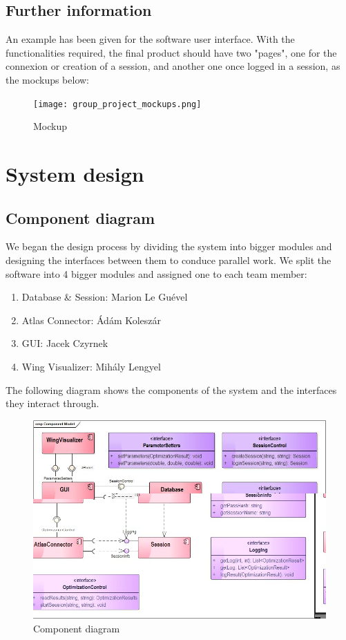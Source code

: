 \documentclass[10pt,a4paper]{report}
\begin{document}
	\section{Further information}
An example has been given for the software user interface. With the functionalities required, the final product should have two "pages", one for the connexion or creation of a session, and another one once logged in a session, as the mockups below:\\
\begin{figure}[h!]
\texttt{[image: group\_project\_mockups.png]}
\caption{Mockup}
\end{figure}


\pagebreak
\chapter{System design}
\section{Component diagram}
We began the design process by dividing the system into bigger modules and designing the interfaces between them to conduce parallel work. We split the software into 4 bigger modules and assigned one to each team member:\\
\begin{enumerate}
\item Database \& Session: Marion Le Guével
\item Atlas Connector: Ádám Koleszár
\item GUI: Jacek Czyrnek
\item Wing Visualizer: Mihály Lengyel
\end{enumerate}
The following diagram shows the components of the system and the interfaces they interact through.
\begin{figure}[h!]
\includegraphics[width=\textwidth]{CompModel.jpg}
\caption{Component diagram}
\end{figure}
\pagebreak
\end{document}
